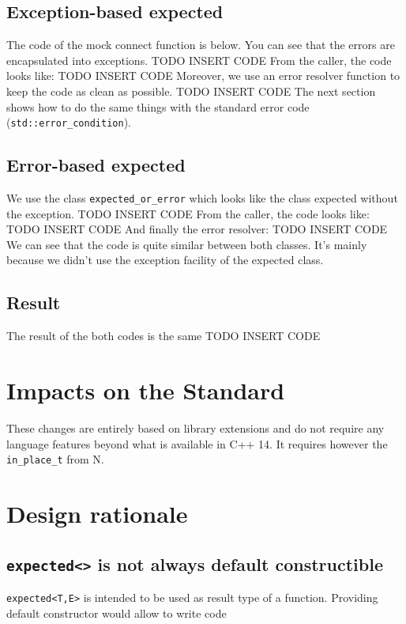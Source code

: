 \documentclass[a4paper,10pt]{article}
\newcommand{\cpp}[1]{\lstinline{#1}}
\begin{document}
\subsection{Exception-based expected}

The code of the mock connect function is below. You can see that the errors are encapsulated into exceptions.
TODO INSERT CODE
From the caller, the code looks like:
TODO INSERT CODE
Moreover, we use an error resolver function to keep the code as clean as possible.
TODO INSERT CODE
The next section shows how to do the same things with the standard error code (\cpp{std::error_condition}).

\subsection{Error-based expected}

We use the class \cpp{expected_or_error} which looks like the class expected without the exception.
TODO INSERT CODE
From the caller, the code looks like:
TODO INSERT CODE
And finally the error resolver:
TODO INSERT CODE
We can see that the code is quite similar between both classes. It's mainly because we didn't use the exception facility of the expected class.

\subsection{Result}

The result of the both codes is the same TODO INSERT CODE

\section{Impacts on the Standard}

These changes are entirely based on library extensions and do not require any language features beyond what is available in C++ 14. It requires however the \cpp{in_place_t} from N.

\section{Design rationale}

\subsection{\cpp{expected<>} is not always default constructible}
\cpp{expected<T,E>} is intended to be used as result type of a function. Providing default constructor would allow to write code
\end{document}
